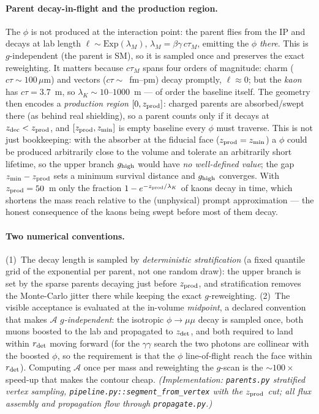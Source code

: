 \documentclass[11pt]{article}
\begin{document}
\paragraph{Parent decay-in-flight and the production region.} The $\phi$ is not
produced at the interaction point: the parent flies from the IP and decays at
lab length $\ell\sim\mathrm{Exp}(\lambda_M)$, $\lambda_M=\beta\gamma\,c\tau_M$,
emitting the $\phi$ \emph{there}. This is $g$-independent (the parent is SM), so
it is sampled once and preserves the exact reweighting. It matters because
$c\tau_M$ spans four orders of magnitude: charm ($c\tau\!\sim\!100\,\mu$m) and
vectors ($c\tau\!\sim\!$~fm--pm) decay promptly, $\ell\!\approx\!0$; but the
\emph{kaon} has $c\tau=3.7$~m, so $\lambda_K\sim\!10$--$1000$~m --- of order the
baseline itself. The geometry then encodes a \emph{production region}
$[0,z_{\rm prod}]$: charged parents are absorbed/swept there (as behind real
shielding), so a parent counts only if it decays at $z_{\rm dec}<z_{\rm prod}$,
and $[z_{\rm prod},z_{\min}]$ is empty baseline every $\phi$ must traverse. This
is not just bookkeeping: with the absorber at the fiducial face
($z_{\rm prod}=z_{\min}$) a $\phi$ could be produced arbitrarily close to the
volume and tolerate an arbitrarily short lifetime, so the upper branch
$g_{\rm high}$ would have \emph{no well-defined value}; the gap
$z_{\min}-z_{\rm prod}$ sets a minimum survival distance and $g_{\rm high}$
converges. With $z_{\rm prod}=50$~m only the fraction $1-e^{-z_{\rm prod}
/\lambda_K}$ of kaons decay in time, which shortens the mass reach relative to
the (unphysical) prompt approximation --- the honest consequence of the kaons
being swept before most of them decay.

\paragraph{Two numerical conventions.} (1)~The decay length is sampled by
\emph{deterministic stratification} (a fixed quantile grid of the exponential per
parent, not one random draw): the upper branch is set by the sparse parents
decaying just before $z_{\rm prod}$, and stratification removes the Monte-Carlo
jitter there while keeping the exact $g$-reweighting. (2)~The visible acceptance
is evaluated at the in-volume \emph{midpoint}, a declared convention that makes
$\mathcal{A}$ \emph{$g$-independent}: the isotropic $\phi\to\mu\mu$ decay is
sampled once, both muons boosted to the lab and propagated to $z_{\rm det}$, and
both required to land within $r_{\rm det}$ moving forward (for the $\gamma\gamma$
search the two photons are collinear with the boosted $\phi$, so the requirement
is that the $\phi$ line-of-flight reach the face within $r_{\rm det}$). Computing
$\mathcal{A}$ once per mass and reweighting the $g$-scan is the $\sim\!100\times$
speed-up that makes the contour cheap. \emph{(Implementation: \texttt{parents.py}
stratified vertex sampling, \texttt{pipeline.py::segment\_from\_vertex} with the
$z_{\rm prod}$ cut; all flux assembly and propagation flow through
\texttt{propagate.py}.)}
\end{document}
